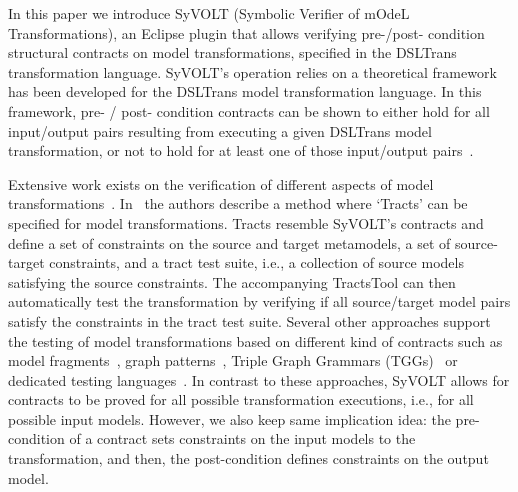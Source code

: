In this paper we introduce SyVOLT (Symbolic Verifier of mOdeL Transformations),
an Eclipse plugin that allows verifying pre-/post- condition structural
contracts on model transformations, specified in the DSLTrans transformation
language. SyVOLT's operation relies on a theoretical framework has been
developed for the DSLTrans model transformation language. In this framework,
pre- / post- condition contracts can be shown to either hold for all input/output pairs resulting from
executing a given DSLTrans model transformation, or not to hold for at least
one of those input/output pairs~\cite{Lucio2014}.


Extensive work exists on the verification of different aspects of model
transformations~\cite{AmraniLSCDVTC12}. In~\cite{Vallecillo2012} the
authors describe a method where `Tracts' can be specified for model
transformations. Tracts resemble SyVOLT's contracts and define a set
of constraints on the source and target metamodels, a set of source-target constraints, and a tract test suite, i.e., a collection of source models
satisfying the source constraints. The accompanying TractsTool can then
automatically test the transformation by verifying if all source/target model
pairs satisfy the constraints in the tract test suite.
Several other approaches support the testing of model transformations based
on different kind of contracts such as model fragments~\cite{Mottu2008}, graph patterns~\cite{Guerra12,BaloghBCGHMPPRVa10},
Triple Graph Grammars (TGGs)~\cite{WieberAS14} or dedicated testing
languages~\cite{Garcia-Dominguez11}. In contrast to these approaches, SyVOLT
allows for contracts to be proved for all possible transformation executions, i.e., for all possible
input models. However, we also keep same implication idea: the pre-condition of
a contract sets constraints on the input models to the transformation, and then,
the post-condition defines constraints on the output model.

